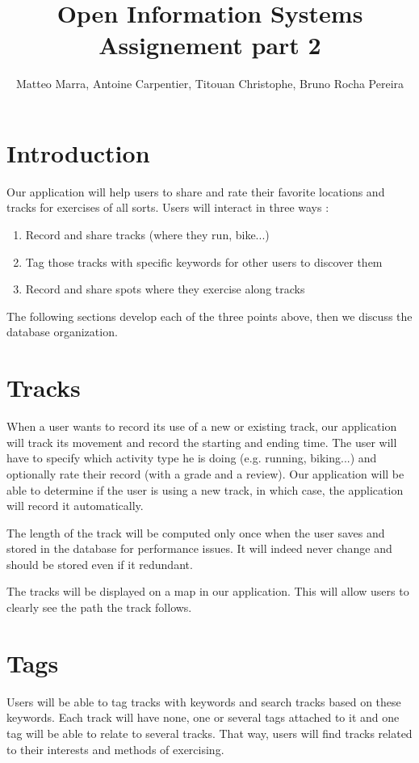 \documentclass[a4paper]{article}
\title{Open Information Systems\\Assignement part 2 }
\author{Matteo Marra, Antoine Carpentier, Titouan Christophe, Bruno Rocha Pereira}
\begin{document}
\maketitle

\section{Introduction}

Our application will help users to share and rate their favorite locations and tracks for exercises of all sorts. Users will interact in three ways : 

\begin{enumerate}
    \item Record and share tracks (where they run, bike...)
    \item Tag those tracks with specific keywords for other users to discover them
    \item Record and share spots where they exercise along tracks
\end{enumerate}

The following sections develop each of the three points above, then we discuss
the database organization.

\section{Tracks}

When a user wants to record its use of a new or existing track, our application will track its movement and record the starting and ending time. The user will have to specify which activity type he is doing (e.g. running, biking...) and optionally rate their record (with a grade and a review). Our application will be able to determine if the user is using a new track, in which case, the application will record it automatically.

The length of the track will be computed only once when the user saves and stored in the database for performance issues. It will indeed never change and should be stored even if it redundant.

The tracks will be displayed on a map in our application. This will allow users to clearly see the path the track follows.

\section{Tags}

Users will be able to tag tracks with keywords and search tracks based on these keywords. Each track will have none, one or several tags attached to it and one tag will be able to relate to several tracks. That way, users will find tracks related to their interests and methods of exercising.
\end{document}
